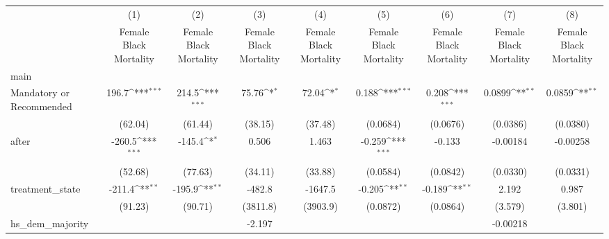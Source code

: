 {
\def\sym#1{\ifmmode^{#1}\else\(^{#1}\)\fi}
\begin{longtable}{l*{8}{c}}
\hline\hline\endfirsthead\hline\endhead\hline\endfoot\endlastfoot
                    &\multicolumn{1}{c}{(1)}&\multicolumn{1}{c}{(2)}&\multicolumn{1}{c}{(3)}&\multicolumn{1}{c}{(4)}&\multicolumn{1}{c}{(5)}&\multicolumn{1}{c}{(6)}&\multicolumn{1}{c}{(7)}&\multicolumn{1}{c}{(8)}\\
                    &\multicolumn{1}{c}{Female Black Mortality}&\multicolumn{1}{c}{Female Black Mortality}&\multicolumn{1}{c}{Female Black Mortality}&\multicolumn{1}{c}{Female Black Mortality}&\multicolumn{1}{c}{Female Black Mortality}&\multicolumn{1}{c}{Female Black Mortality}&\multicolumn{1}{c}{Female Black Mortality}&\multicolumn{1}{c}{Female Black Mortality}\\
\hline
main                &                     &                     &                     &                     &                     &                     &                     &                     \\
Mandatory or Recommended&       196.7\sym{***}&       214.5\sym{***}&       75.76\sym{*}  &       72.04\sym{*}  &       0.188\sym{***}&       0.208\sym{***}&      0.0899\sym{**} &      0.0859\sym{**} \\
                    &     (62.04)         &     (61.44)         &     (38.15)         &     (37.48)         &    (0.0684)         &    (0.0676)         &    (0.0386)         &    (0.0380)         \\
[1em]
after               &      -260.5\sym{***}&      -145.4\sym{*}  &       0.506         &       1.463         &      -0.259\sym{***}&      -0.133         &    -0.00184         &    -0.00258         \\
                    &     (52.68)         &     (77.63)         &     (34.11)         &     (33.88)         &    (0.0584)         &    (0.0842)         &    (0.0330)         &    (0.0331)         \\
[1em]
treatment\_state     &      -211.4\sym{**} &      -195.9\sym{**} &      -482.8         &     -1647.5         &      -0.205\sym{**} &      -0.189\sym{**} &       2.192         &       0.987         \\
                    &     (91.23)         &     (90.71)         &    (3811.8)         &    (3903.9)         &    (0.0872)         &    (0.0864)         &     (3.579)         &     (3.801)         \\
[1em]
hs\_dem\_majority     &                     &                     &      -2.197         &                     &                     &                     &    -0.00218         &                     \\

\end{longtable}}
